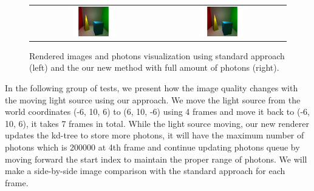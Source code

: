 \begin{figure}[htp]
\begin{center}
	\begin{tabular}{c | c}
		\includegraphics*[width=0.35\textwidth]{imgs/pq_frame9.pdf} &
		\includegraphics*[width=0.35\textwidth]{imgs/pq_ref.pdf}
	\end{tabular}
\renewcommand{\thefigure}{\thechapter.\arabic{figure}}
\caption[Comparison of images rendered by the standard implementation and new approach with full amount of photons]{Rendered images and photons visualization using standard approach (left) and the our new method with full amount of photons (right). }
    \label{fig:new_vs_standard}
\end{center}
\end{figure}

In the following group of tests, we present how the image quality changes with the moving light source using our approach. We move the light source from the world coordinates (-6, 10, 6) to (6, 10, -6) using 4 frames and move it back to (-6, 10, 6), it takes 7 frames in total. While the light source moving, our new renderer updates the kd-tree to store more photons, it will have the maximum number of photons which is 200000 at 4th frame and continue updating photons queue by moving forward the start index to maintain the proper range of photons. We will make a side-by-side image comparison with the standard approach for each frame.

